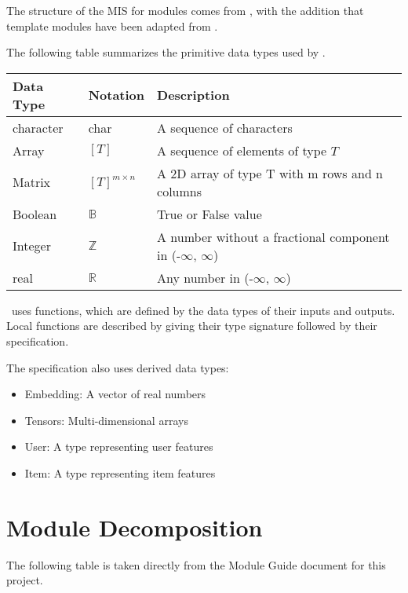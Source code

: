 \documentclass[12pt, titlepage]{article}
\begin{document}

The structure of the MIS for modules comes from \citet{HoffmanAndStrooper1995},
with the addition that template modules have been adapted from
\cite{GhezziEtAl2003}.

The following table summarizes the primitive data types used by \progname. 

\begin{center}
\renewcommand{\arraystretch}{1.2}
\noindent 
\begin{tabular}{l l p{7.5cm}} 
\toprule 
\textbf{Data Type} & \textbf{Notation} & \textbf{Description}\\ 
\midrule
character & char & A sequence of characters\\
Array & $[T]$ & A sequence of elements of type $T$\\
Matrix &$[T]^{m\times n}$ & A 2D array of type T with m rows and n columns\\
Boolean & $\mathbb{B}$ & True or False value\\
Integer & $\mathbb{Z}$ & A number without a fractional component in (-$\infty$, $\infty$) \\
real & $\mathbb{R}$ & Any number in (-$\infty$, $\infty$)\\
\bottomrule
\end{tabular} 
\end{center}

\noindent
\progname \ uses functions, which
are defined by the data types of their inputs and outputs. Local functions are
described by giving their type signature followed by their specification.

The specification also uses derived data types:
\begin{itemize}
  \item Embedding: A vector of real numbers
  \item Tensors: Multi-dimensional arrays
  \item User: A type representing user features
  \item Item: A type representing item features
\end{itemize}


\section{Module Decomposition}

The following table is taken directly from the Module Guide document for this project.
\end{document}
